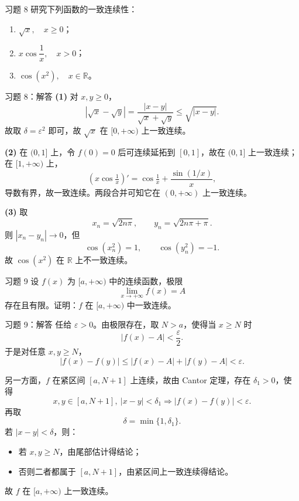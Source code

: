 ﻿\documentclass[aspectratio=169,11pt]{ctexbeamer}
\newcommand{\R}{\mathbb{R}}
\begin{document}
\begin{frame}{习题 8}
研究下列函数的一致连续性：
\begin{enumerate}
  \item $\sqrt{x},\quad x\ge 0$；
  \item $x\cos\dfrac1x,\quad x>0$；
  \item $\cos(x^2),\quad x\in\R$。
\end{enumerate}
\end{frame}

\begin{frame}[allowframebreaks]{习题 8：解答}
\textbf{(1)} 对 $x,y\ge 0$，
\[
  |\sqrt{x}-\sqrt{y}|=\frac{|x-y|}{\sqrt{x}+\sqrt{y}}\le \sqrt{|x-y|}.
\]
故取 $\delta=\varepsilon^2$ 即可，故 $\sqrt{x}$ 在 $[0,+\infty)$ 上一致连续。
\vspace{0.4em}

\textbf{(2)} 在 $(0,1]$ 上，令 $f(0)=0$ 后可连续延拓到 $[0,1]$，故在 $(0,1]$ 上一致连续；在 $[1,+\infty)$ 上，
\[
  (x\cos\tfrac1x)'=\cos\tfrac1x+\frac{\sin(1/x)}{x},
\]
导数有界，故一致连续。两段合并可知它在 $(0,+\infty)$ 上一致连续。
\vspace{0.4em}

\textbf{(3)} 取
\[
  x_n=\sqrt{2n\pi},\qquad y_n=\sqrt{2n\pi+\pi}.
\]
则 $|x_n-y_n|\to 0$，但
\[
  \cos(x_n^2)=1,\qquad \cos(y_n^2)=-1.
\]
故 $\cos(x^2)$ 在 $\R$ 上不一致连续。
\end{frame}

\begin{frame}{习题 9}
设 $f(x)$ 为 $[a,+\infty)$ 中的连续函数，极限
\[
  \lim_{x\to+\infty}f(x)=A
\]
存在且有限。证明：$f$ 在 $[a,+\infty)$ 中一致连续。
\end{frame}

\begin{frame}[allowframebreaks]{习题 9：解答}
任给 $\varepsilon>0$。由极限存在，取 $N>a$，使得当 $x\ge N$ 时
\[
  |f(x)-A|<\frac{\varepsilon}{2}.
\]
于是对任意 $x,y\ge N$，
\[
  |f(x)-f(y)|\le |f(x)-A|+|f(y)-A|<\varepsilon.
\]
\vspace{0.5em}

另一方面，$f$ 在紧区间 $[a,N+1]$ 上连续，故由 Cantor 定理，存在 $\delta_1>0$，使得
\[
  x,y\in[a,N+1],\ |x-y|<\delta_1 \Longrightarrow |f(x)-f(y)|<\varepsilon.
\]
再取
\[
  \delta=\min\{1,\delta_1\}.
\]
若 $|x-y|<\delta$，则：
\begin{itemize}
  \item 若 $x,y\ge N$，由尾部估计得结论；
  \item 否则二者都属于 $[a,N+1]$，由紧区间上一致连续得结论。
\end{itemize}
故 $f$ 在 $[a,+\infty)$ 上一致连续。
\end{frame}
\end{document}
